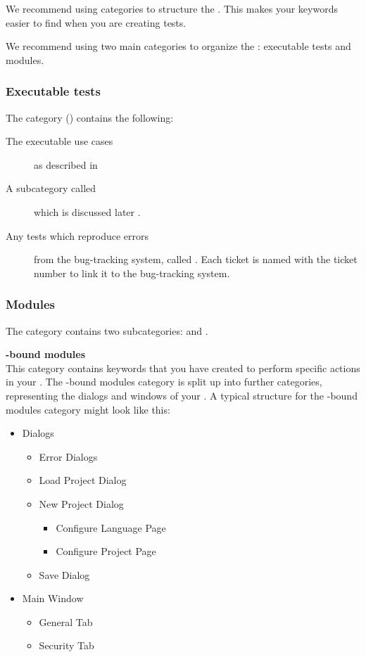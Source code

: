 We recommend using categories  to structure the \gdtestcasebrowser{}. This makes your keywords easier to find when you are creating tests. 

We recommend using two main categories to organize the \gdtestcasebrowser{}: executable tests and modules. 

\subsubsection{Executable tests}
The  category () contains the following:
\begin{description}
\item [The executable use cases]{as described in }
\item [A subcategory called \bxname{\gdehandlers{}}]{which is discussed later }.
\item [Any tests which reproduce errors]{ from the bug-tracking system, called . Each ticket \gdcase{} is named with the ticket number to link it to the bug-tracking system. }
\end{description}

\subsubsection{Modules}
The  category contains two subcategories:  and . 

\textbf{\gdaut{}-bound modules}\\
This category contains keywords that you have created to perform specific actions in your \gdaut{}. The \gdaut{}-bound modules category is split up into further categories, representing the dialogs and windows of your \gdaut{}. A typical structure for the \gdaut{}-bound modules category might look like this:
\begin{itemize}
\item Dialogs
\begin{itemize}
\item Error Dialogs
\item Load Project Dialog
\item New Project Dialog
\begin{itemize}
\item Configure Language Page
\item Configure Project Page
\end{itemize}
\item Save Dialog
\end{itemize}
\item Main Window
\begin{itemize}
\item General Tab
\item Security Tab
\end{itemize}
\end{itemize}

